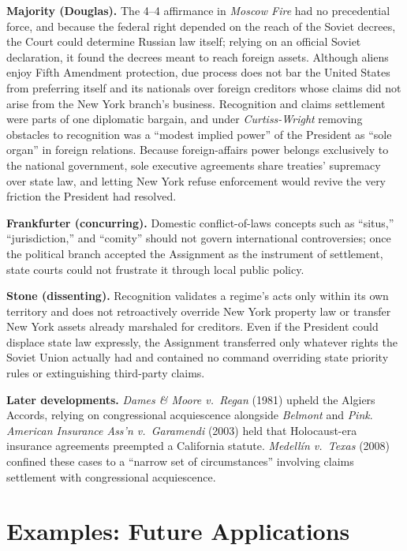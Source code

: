 \documentclass[12pt]{article}
\begin{document}
\textbf{Majority (Douglas).} The 4--4 affirmance in \textit{Moscow Fire} had no precedential force, and because the federal right depended on the reach of the Soviet decrees, the Court could determine Russian law itself; relying on an official Soviet declaration, it found the decrees meant to reach foreign assets. Although aliens enjoy Fifth Amendment protection, due process does not bar the United States from preferring itself and its nationals over foreign creditors whose claims did not arise from the New York branch's business. Recognition and claims settlement were parts of one diplomatic bargain, and under \textit{Curtiss-Wright} removing obstacles to recognition was a ``modest implied power'' of the President as ``sole organ'' in foreign relations. Because foreign-affairs power belongs exclusively to the national government, sole executive agreements share treaties' supremacy over state law, and letting New York refuse enforcement would revive the very friction the President had resolved.

\textbf{Frankfurter (concurring).} Domestic conflict-of-laws concepts such as ``situs,'' ``jurisdiction,'' and ``comity'' should not govern international controversies; once the political branch accepted the Assignment as the instrument of settlement, state courts could not frustrate it through local public policy.

\textbf{Stone (dissenting).} Recognition validates a regime's acts only within its own territory and does not retroactively override New York property law or transfer New York assets already marshaled for creditors. Even if the President could displace state law expressly, the Assignment transferred only whatever rights the Soviet Union actually had and contained no command overriding state priority rules or extinguishing third-party claims.

\textbf{Later developments.} \textit{Dames \& Moore v.\ Regan} (1981) upheld the Algiers Accords, relying on congressional acquiescence alongside \textit{Belmont} and \textit{Pink}. \textit{American Insurance Ass'n v.\ Garamendi} (2003) held that Holocaust-era insurance agreements preempted a California statute. \textit{Medell\'in v.\ Texas} (2008) confined these cases to a ``narrow set of circumstances'' involving claims settlement with congressional acquiescence.

\section{Examples: Future Applications}
\end{document}
